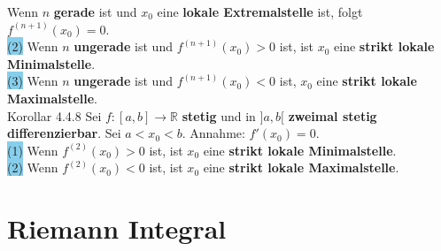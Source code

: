 \documentclass[landscape, 10pt]{article}
\newcommand{\R}{\mathbb{R}}
\begin{document}
\begin{multicols}{3}
                            Wenn \textcolor{NavyBlue}{$n$} 
                            \textbf{gerade} 
                            ist und \textcolor{NavyBlue}{$x_0$} eine 
                            \textbf{lokale Extremalstelle} ist, folgt
                            \textcolor{NavyBlue}{ $f^{(n+1)}(x_0)=0$}. \\
                     \colorbox{SkyBlue}{(2)} Wenn \textcolor{NavyBlue}{$n$} 
                            \textbf{ungerade}
                            ist und 
                            \textcolor{NavyBlue}{$f^{(n+1)}(x_0)>0$} ist, ist 
                            \textcolor{NavyBlue}{$x_0$} 
                            eine \textbf{strikt lokale Minimalstelle}. \\
                     \colorbox{SkyBlue}{(3)} Wenn \textcolor{NavyBlue}{$n$} 
                            \textbf{ungerade} 
                            ist und \textcolor{NavyBlue}{$f^{(n+1)}(x_0)<0$} ist,
                            \textcolor{NavyBlue}{$x_0$} eine 
                            \textbf{strikt lokale Maximalstelle}. \\
              \colorbox{BurntOrange}{Korollar 4.4.8} 
                     Sei \textcolor{NavyBlue}{$f:[a,b]\longrightarrow\R$} 
                     \textbf{stetig} und in \textcolor{NavyBlue}{$]a,b[$}
                     \textbf{zweimal stetig differenzierbar}. Sei 
                     \textcolor{NavyBlue}{$a<x_0<b$}. 
                     Annahme: \textcolor{NavyBlue}{$f'(x_0)=0$}.\\
                     \colorbox{SkyBlue}{(1)} Wenn 
                            \textcolor{NavyBlue}{$f^{(2)}(x_0)>0$} ist, ist 
                            \textcolor{NavyBlue}{$x_0$}
                            eine \textbf{strikt lokale Minimalstelle}. \\
                     \colorbox{SkyBlue}{(2)} Wenn 
                            \textcolor{NavyBlue}{$f^{(2)}(x_0)<0$} ist, ist
                            \textcolor{NavyBlue}{$x_0$}
                            eine \textbf{strikt lokale Maximalstelle}.

\section{Riemann Integral}

\end{multicols}
\end{document}
